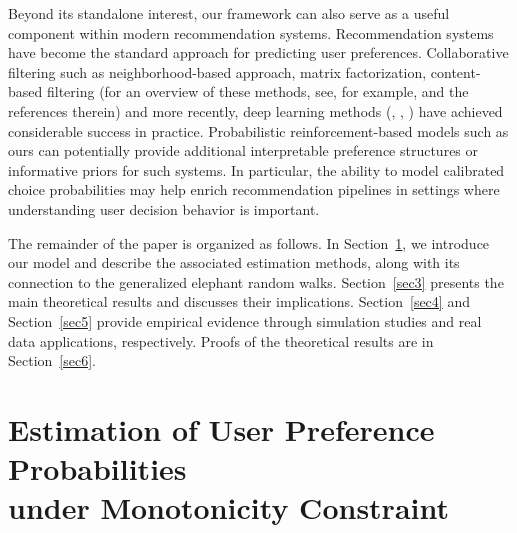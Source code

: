 \documentclass[12pt]{amsart}
\theoremstyle{plain}
\theoremstyle{remark}
\numberwithin{equation}{section}
\begin{document}
Beyond its standalone interest, our framework can also serve as a useful 
component within modern recommendation systems. Recommendation systems have become the standard approach for predicting user preferences. Collaborative filtering 
such as neighborhood-based approach, matrix factorization, content-based filtering (for an overview of these methods, see, for example, \cite{Aggarwal2016} and the references therein) and more recently, deep learning methods (\cite{chen2022sequential}, \cite{covington2016deep}, \cite{zhang2019deep}) have achieved considerable success in practice. Probabilistic reinforcement-based models such as ours can potentially provide additional interpretable preference structures or informative priors for such systems. In particular, the ability to model calibrated choice probabilities may help enrich recommendation pipelines in settings where understanding user decision behavior is important. 

The remainder of the paper is organized as follows. In Section~\ref{sec2}, we introduce our model and describe the associated estimation methods, along with its connection to the generalized elephant random walks. Section~\ref{sec3} presents the main theoretical results and discusses their implications. Section~\ref{sec4} and Section~\ref{sec5} provide empirical evidence through simulation studies and real data applications, respectively. Proofs of the theoretical results are in Section~\ref{sec6}.

\section{Estimation of User Preference Probabilities \\ under Monotonicity Constraint}\label{sec2}
\end{document}

